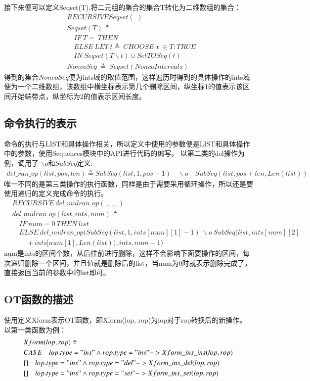 接下来便可以定义Seqset(T),将二元组的集合的集合T转化为二维数组的集合：
\begin{align*}
&RECURSIVE Seqset(\_)\\
&Seqset(T) \triangleq  \\
& \quad IF\ T = {}\ THEN\ {}\\
& \quad ELSE\ LET\ t\triangleq\ CHOOSE\ x\ \in T : TRUE\\
& \quad IN\ Seqset(T \backslash {t}) \cup {SetTOSeq(t)} \\
&NoncoSeq\ \triangleq\ Seqset(NoncoIntervals)
\end{align*}
得到的集合$NoncoSeq$便为ints域的取值范围，这样遍历时得到的具体操作的ints域便为一个二维数组，该数组中横坐标表示第几个删除区间，纵坐标1的值表示该区间开始端带点，纵坐标为2的值表示区间长度。

\subsection{命令执行的表示}
命令的执行与LIST和具体操作相关，所以定义中使用的参数便是LIST和具体操作中的参数，使用Sequences模块中的API进行代码的编写。
以第二类的del操作为例，调用了 $\backslash o$和$SubSeq$定义:
\begin{align*}
del\_ran\_op(list,pos,len) \triangleq SubSeq(list, 1, pos-1) \quad \backslash o \quad SubSeq(list, pos+len, Len(list))
\end{align*}
唯一不同的是第三类操作的执行函数，同样是由于需要采用循环操作，所以还是要使用递归的定义完成命令的执行。
\begin{align*}
&RECURSIVE\ del\_mulran\_op(\_,\_,\_)\\
&del\_mulran\_op(list,ints,num) \triangleq \\
&  \quad  IF\ num = 0\ THEN\ list \\
&  \quad  ELSE\ del\_mulran\_op(SubSeq(list, 1, ints[num][1]-1)\ \backslash o\ SubSeq(list, ints[num][2]\\
&   \quad \quad  +ints[num[1],Len(list)),ints,num-1)    
\end{align*}
num是ints的区间个数，从后往前进行删除，这样不会影响下面要操作的区间，每次递归删除一个区间，并且值就是删除后的list，当num为0时就表示删除完成了，直接返回当前的参数中的list即可。

\subsection{OT函数的描述}
使用定义Xform表示OT函数，即Xform(lop, rop)为lop对于rop转换后的新操作。
以第一类函数为例：
\begin{align*}
&Xform(lop, rop) \triangleq \\
   & CASE \quad lop.type = "ins" \land rop.type = "ins" -> Xform\_ins\_ins(lop, rop)\\
   & []  \quad lop.type = "ins" \land rop.type = "del" -> Xform\_ins\_del(lop, rop)  \\
   & [] \quad  lop.type = "ins" \land rop.type = "set" -> Xform\_ins\_set(lop, rop)  
\end{align*}
